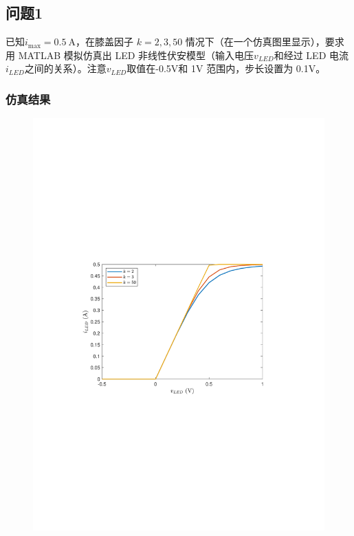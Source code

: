 \documentclass[11pt]{article}
\begin{document}
\subsection{问题1}
已知$i_{\mathrm{max}} = 0.5 \mathrm{~A}$，在膝盖因子 $k = 2, 3, 50$ 情况下（在一个仿真图里显示），要求用 MATLAB 模拟仿真出 LED 非线性伏安模型（输入电压$v_{LED}$和经过 LED 电流$i_{LED}$之间的关系）。注意$v_{LED}$取值在-0.5V和 1V 范围内，步长设置为 0.1V。

\subsubsection*{仿真结果}
\begin{figure}
  \centering
  \includegraphics[width=\textwidth]{fig1.pdf}
  \label{fig:1}
\end{figure}
\end{document}
